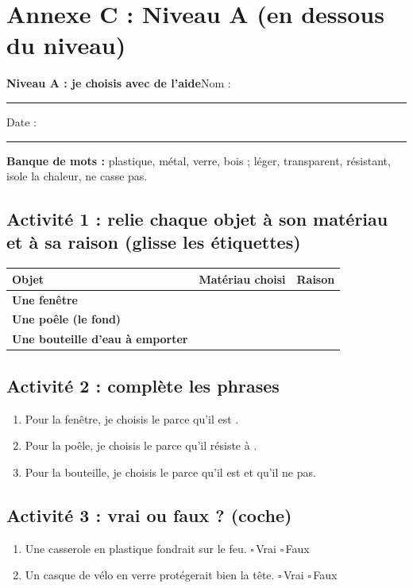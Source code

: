 \documentclass[11pt,a4paper]{article}
\newcommand{\cb}{$\square$\,}
\newcommand{\entete}[2]{%
  \begin{tcolorbox}[colback=#1!10,colframe=#1!70!black,boxrule=0.8pt,arc=2mm]
  {\Large\bfseries #2}\hfill Nom : \rule{4cm}{0.3pt}\quad Date : \rule{2.2cm}{0.3pt}
  \end{tcolorbox}}
\begin{document}
\newpage
\section*{Annexe C : Niveau A (en dessous du niveau)}
\entete{orange}{Niveau A : je choisis avec de l'aide}

\textbf{Banque de mots :} plastique, métal, verre, bois ; léger, transparent, résistant, isole la chaleur, ne casse pas.

\subsection*{Activité 1 : relie chaque objet à son matériau et à sa raison (glisse les étiquettes)}
\begin{tabularx}{\linewidth}{>{\bfseries}p{4cm}Y Y}
\toprule
Objet & Matériau choisi & Raison\\
\midrule
Une fenêtre & & \\
Une poêle (le fond) & & \\
Une bouteille d'eau à emporter & & \\
\bottomrule
\end{tabularx}

\subsection*{Activité 2 : complète les phrases}
\begin{enumerate}
 \item Pour la fenêtre, je choisis le \dotfill{} parce qu'il est \dotfill.
 \item Pour la poêle, je choisis le \dotfill{} parce qu'il résiste à \dotfill.
 \item Pour la bouteille, je choisis le \dotfill{} parce qu'il est \dotfill{} et qu'il ne \dotfill{} pas.
\end{enumerate}

\subsection*{Activité 3 : vrai ou faux ? (coche)}
\begin{enumerate}
 \item Une casserole en plastique fondrait sur le feu. \quad \cb Vrai \quad \cb Faux
 \item Un casque de vélo en verre protégerait bien la tête. \quad \cb Vrai \quad \cb Faux
\end{enumerate}
\end{document}
